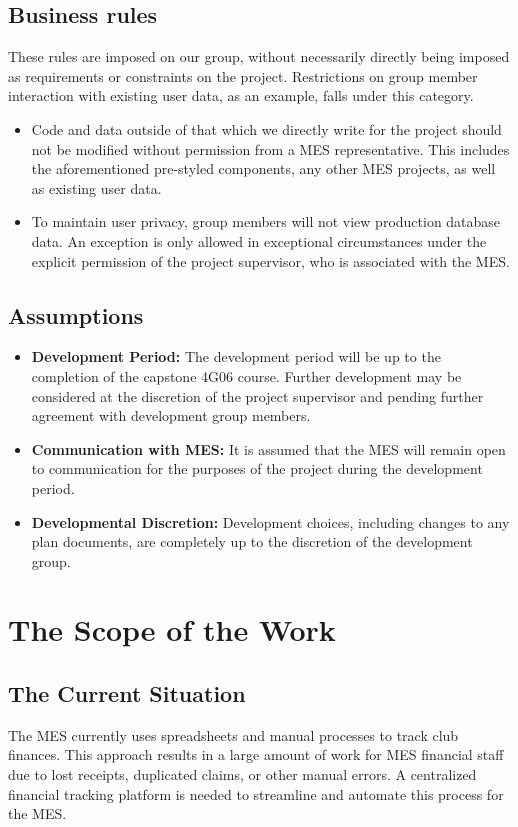 \documentclass[12pt]{article}
\begin{document}
  \subsection{Business rules}
  These rules are imposed on our group, without necessarily directly being imposed as requirements or constraints on the project. Restrictions on group member interaction with existing user data, as an example, falls under this category.
  \begin{itemize}
    \item Code and data outside of that which we directly write for the project should not be modified without permission from a MES representative. This includes the aforementioned pre-styled components, any other MES projects, as well as existing user data.
    \item To maintain user privacy, group members will not view production database data. An exception is only allowed in exceptional circumstances under the explicit permission of the project supervisor, who is associated with the MES.
  \end{itemize}
  \subsection{Assumptions}
  \begin{itemize}
    \item \textbf{Development Period:} The development period will be up to the completion of the capstone 4G06 course. Further development may be considered at the discretion of the project supervisor and pending further agreement with development group members.
    \item \textbf{Communication with MES:} It is assumed that the MES will remain open to communication for the purposes of the project during the development period.
    \item \textbf{Developmental Discretion:} Development choices, including changes to any plan documents, are completely up to the discretion of the development group.
  \end{itemize}

\section{The Scope of the Work}
  \subsection{The Current Situation}
    The MES currently uses spreadsheets and manual processes
    to track club finances. This approach results in a large amount of work for MES financial
    staff due to lost receipts, duplicated claims, or other manual errors. A centralized
    financial tracking platform is needed to streamline and automate this process for the MES.
\end{document}
